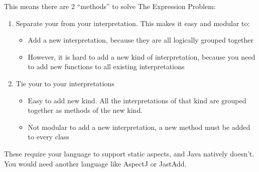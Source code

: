 This means there are 2 ``methods'' to solve The Expression Problem:
\begin{enumerate}[noitemsep]
\item Separate your  from your interpretation.
  This makes it easy and modular to:
  \begin{itemize}[noitemsep]
  \item Add a new interpretation, because they are all logically grouped together
  \item However, it is hard to add a new kind of interpretation, because you need to add new functions to all existing interpretations
  \end{itemize}
\item Tie your  to your interpretations
  \begin{itemize}[noitemsep]
  \item Easy to add new kind. All the interpretations of that kind are grouped together as methods of the new kind.
  \item Not modular to add a new interpretation, a new method must be added to every class
  \end{itemize}
\end{enumerate}

These require your language to support static aspects, and Java natively doesn't.
You would need another language like AspectJ or JastAdd.

